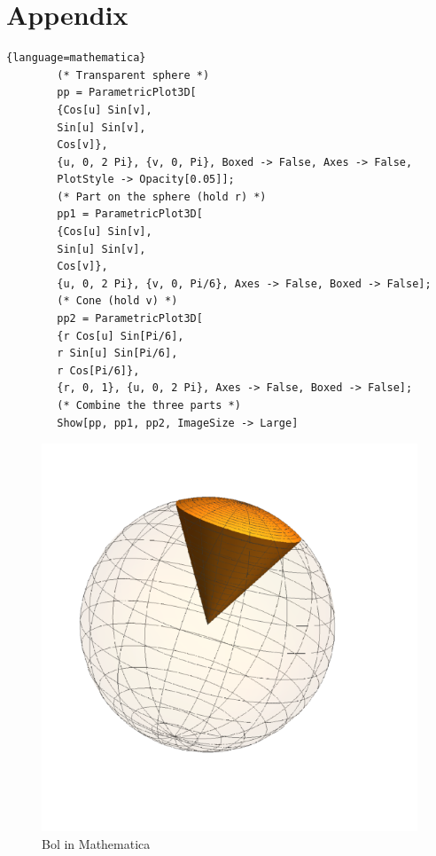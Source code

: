 \documentclass{article}
\begin{document}
    \section{Appendix}\label{sec:appendix}
    \begin{lstlisting}{language=mathematica}
        (* Transparent sphere *)
        pp = ParametricPlot3D[
        {Cos[u] Sin[v],
        Sin[u] Sin[v],
        Cos[v]},
        {u, 0, 2 Pi}, {v, 0, Pi}, Boxed -> False, Axes -> False,
        PlotStyle -> Opacity[0.05]];
        (* Part on the sphere (hold r) *)
        pp1 = ParametricPlot3D[
        {Cos[u] Sin[v],
        Sin[u] Sin[v],
        Cos[v]},
        {u, 0, 2 Pi}, {v, 0, Pi/6}, Axes -> False, Boxed -> False];
        (* Cone (hold v) *)
        pp2 = ParametricPlot3D[
        {r Cos[u] Sin[Pi/6],
        r Sin[u] Sin[Pi/6],
        r Cos[Pi/6]},
        {r, 0, 1}, {u, 0, 2 Pi}, Axes -> False, Boxed -> False];
        (* Combine the three parts *)
        Show[pp, pp1, pp2, ImageSize -> Large]
    \end{lstlisting}
    \begin{figure}[h!]
        \centering
        \includegraphics[width=.5\textwidth]{bol.png}
        \caption{Bol in Mathematica}\label{bolMMa}
    \end{figure}
\end{document}
